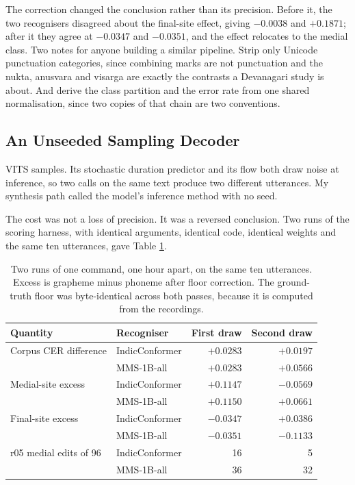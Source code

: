 \documentclass[runningheads]{llncs}
\begin{document}
The correction changed the conclusion rather than its precision. Before it, the
two recognisers disagreed about the final-site effect, giving $-0.0038$ and
$+0.1871$; after it they agree at $-0.0347$ and $-0.0351$, and the effect
relocates to the medial class. Two notes for anyone building a similar
pipeline. Strip only Unicode punctuation categories, since combining marks are
not punctuation and the nukta, anusvara and visarga are exactly the contrasts a
Devanagari study is about. And derive the class partition and the error rate
from one shared normalisation, since two copies of that chain are two
conventions.

\subsection{An Unseeded Sampling Decoder}
\label{sec:seed}

VITS samples. Its stochastic duration predictor and its flow both draw noise
at inference, so two calls on the same text produce two different utterances.
My synthesis path called the model's inference method with no seed.

The cost was not a loss of precision. It was a reversed conclusion. Two runs
of the scoring harness, with identical arguments, identical code, identical
weights and the same ten utterances, gave Table \ref{tab:draws}.

\begin{table}[t]
\centering
\caption{Two runs of one command, one hour apart, on the same ten utterances.
Excess is grapheme minus phoneme after floor correction. The ground-truth
floor was byte-identical across both passes, because it is computed from the
recordings.}
\label{tab:draws}
\begin{tabular}{llrr}
\toprule
Quantity & Recogniser & First draw & Second draw \\
\midrule
Corpus CER difference & IndicConformer & $+0.0283$ & $+0.0197$ \\
                      & MMS-1B-all     & $+0.0283$ & $+0.0566$ \\
Medial-site excess    & IndicConformer & $+0.1147$ & $-0.0569$ \\
                      & MMS-1B-all     & $+0.1150$ & $+0.0661$ \\
Final-site excess     & IndicConformer & $-0.0347$ & $+0.0386$ \\
                      & MMS-1B-all     & $-0.0351$ & $-0.1133$ \\
\midrule
r05 medial edits of 96 & IndicConformer & 16 & 5 \\
                       & MMS-1B-all     & 36 & 32 \\
\bottomrule
\end{tabular}
\end{table}
\end{document}
